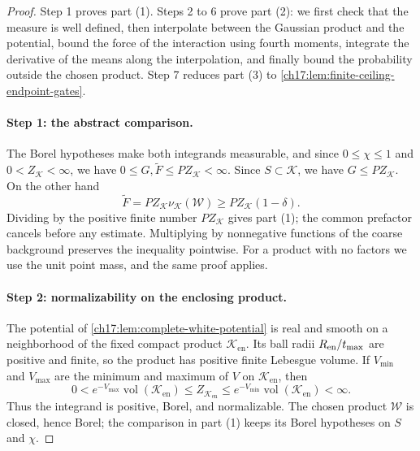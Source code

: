 \begin{proof}
Step 1 proves part (1). Steps 2 to 6 prove part (2): we first check that the measure is well defined, then interpolate between the Gaussian product and the potential, bound the force of the interaction using fourth moments, integrate the derivative of the means along the interpolation, and finally bound the probability outside the chosen product. Step 7 reduces part (3) to \cref{ch17:lem:finite-ceiling-endpoint-gates}.

\paragraph{Step 1: the abstract comparison.}
The Borel hypotheses make both integrands measurable, and since $0\le\chi\le1$ and $0<Z_{\mathcal K}<\infty$, we have $0\le G,\widetilde F\le P Z_{\mathcal K}<\infty$. Since $S\subset\mathcal K$, we have $G\le P Z_{\mathcal K}$. On the other hand
\[
 \widetilde F=P Z_{\mathcal K}\nu_{\mathcal K}(\mathcal W)\ge P Z_{\mathcal K}(1-\delta).
\]
Dividing by the positive finite number $P Z_{\mathcal K}$ gives part (1); the common prefactor cancels before any estimate. Multiplying by nonnegative functions of the coarse background preserves the inequality pointwise. For a product with no factors we use the unit point mass, and the same proof applies.

\paragraph{Step 2: normalizability on the enclosing product.}
The potential of \cref{ch17:lem:complete-white-potential} is real and smooth on a neighborhood of the fixed compact product $\mathcal K_{\mathrm{en}}$. Its ball radii $R_{\mathrm{en}}/t_{\max}$ are positive and finite, so the product has positive finite Lebesgue volume. If $V_{\min}$ and $V_{\max}$ are the minimum and maximum of $V$ on $\mathcal K_{\mathrm{en}}$, then
\[
 0<e^{-V_{\max}}\operatorname{vol}(\mathcal K_{\mathrm{en}})\le Z_{\mathcal K_{\mathrm{en}}}\le e^{-V_{\min}}\operatorname{vol}(\mathcal K_{\mathrm{en}})<\infty.
\]
Thus the integrand is positive, Borel, and normalizable. The chosen product $\mathcal W$ is closed, hence Borel; the comparison in part (1) keeps its Borel hypotheses on $S$ and $\chi$.


\end{proof}
